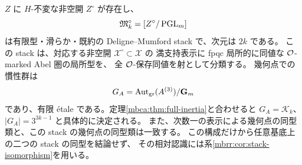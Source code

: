 \begin{theorem}
\label{mbg:thm:generic-stack}
$Z$ に $H$-不変な非空開 $Z^\circ$ が存在し、
\begin{equation}\label{mbg:eq:generic-stack}
 \mathfrak M_k^\circ=[Z^\circ/\operatorname{PGL}_m]
\end{equation}
は有限型・滑らか・既約の Deligne--Mumford stack で、次元は $2k$ である。
この stack は、対応する非空開 $\mathcal X^\circ\subset\mathcal X$ の
満支持表示に fpqc 局所的に同値な $\mathcal O$-marked Abel 圏の局所型を、
全 $\mathcal O$-保存同値を射として分類する。
幾何点での慣性群は
\[
 G_A=\operatorname{Aut}_{\mathrm{gr}}(A^{(3)})/\mathbf G_m
\]
であり、有限 \'etale である。定理\ref{mbca:thm:full-inertia}と合わせると
$G_A=\mathcal K_k$、$|G_A|=3^{3k-1}$ と具体的に決定される。
また、次数一の表示による幾何点の同型類と、この stack の幾何点の同型類は一致する。
この構成だけから任意基底上の二つの stack の同型を結論せず、
その相対認識には系\ref{mbrr:cor:stack-isomorphism}を用いる。
\end{theorem}
